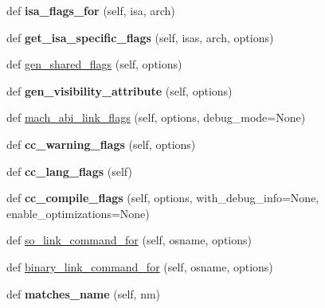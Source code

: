 \begin{DoxyCompactItemize}
\item 
\mbox{\label{namespaceconfigure_afee0a4ed31fdd4ec0bf205615e9e5a1a}} 
def {\bfseries isa\+\_\+flags\+\_\+for} (self, isa, arch)
\item 
\mbox{\label{namespaceconfigure_aac758a1fca3f4d99fe357d59f12ac1f2}} 
def {\bfseries get\+\_\+isa\+\_\+specific\+\_\+flags} (self, isas, arch, options)
\item 
def \mbox{\hyperlink{namespaceconfigure_ade098de41c945183bca8df2789f0b8b6}{gen\+\_\+shared\+\_\+flags}} (self, options)
\item 
\mbox{\label{namespaceconfigure_acc22e9a2cb00cc2c72ac8f698f2c9a24}} 
def {\bfseries gen\+\_\+visibility\+\_\+attribute} (self, options)
\item 
def \mbox{\hyperlink{namespaceconfigure_ad3538577a74695d9c40c43c753652f99}{mach\+\_\+abi\+\_\+link\+\_\+flags}} (self, options, debug\+\_\+mode=None)
\item 
\mbox{\label{namespaceconfigure_a4602f88b28589fec5b9eee0dd21dfc51}} 
def {\bfseries cc\+\_\+warning\+\_\+flags} (self, options)
\item 
\mbox{\label{namespaceconfigure_a2b92a74711431c7244c9189c6ee97ec1}} 
def {\bfseries cc\+\_\+lang\+\_\+flags} (self)
\item 
\mbox{\label{namespaceconfigure_a287fb61f98254c0c417a7a153ba3b4b5}} 
def {\bfseries cc\+\_\+compile\+\_\+flags} (self, options, with\+\_\+debug\+\_\+info=None, enable\+\_\+optimizations=None)
\item 
def \mbox{\hyperlink{namespaceconfigure_a755a51474db2ecab893bd674b15bc677}{so\+\_\+link\+\_\+command\+\_\+for}} (self, osname, options)
\item 
def \mbox{\hyperlink{namespaceconfigure_a6d2c0646f8822fbf51dd20e1dd81d1ad}{binary\+\_\+link\+\_\+command\+\_\+for}} (self, osname, options)
\item 
\mbox{\label{namespaceconfigure_a2ade8f4cef7bc88e44cf3b74feb52d17}} 
def {\bfseries matches\+\_\+name} (self, nm)
\item 
\mbox{\label{namespaceconfigure_af9426004a1ff135241501ce7cc34910c}} 

\end{DoxyCompactItemize}
